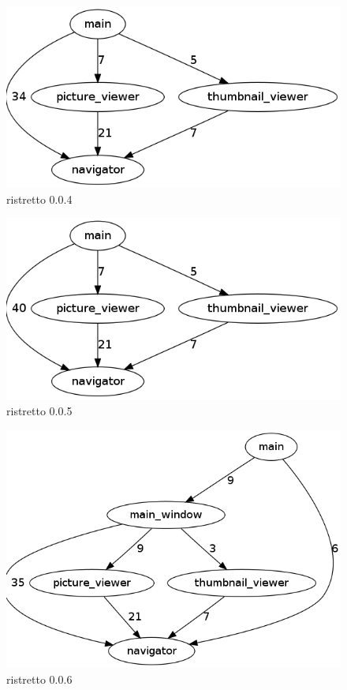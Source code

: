 \begin{figure}[h]
\center
\includegraphics[scale=0.4]{imagens/ristretto-0_0_4-doxyparse-2}
\caption{ristretto 0.0.4}
\label{fig:ristretto-0.0.4-doxyparse-2-anexo}
\end{figure}

\begin{figure}[h]
\center
\includegraphics[scale=0.4]{imagens/ristretto-0_0_5-doxyparse-2}
\caption{ristretto 0.0.5}
\label{fig:ristretto-0.0.5-doxyparse-2-anexo}
\end{figure}

\begin{figure}[h]
\center
\includegraphics[scale=0.4]{imagens/ristretto-0_0_6-doxyparse-2}
\caption{ristretto 0.0.6}
\label{fig:ristretto-0.0.6-doxyparse-2-anexo}
\end{figure}

